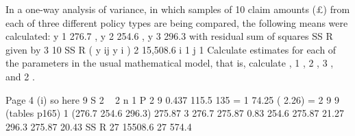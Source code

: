 \documentclass[a4paper,12pt]{article}
\begin{document}
In a one-way analysis of variance, in which samples of 10 claim amounts (£) from
each of three different policy types are being compared, the following means were
calculated:
y 1
276.7 ,
y 2
254.6 ,
y 3
296.3
with residual sum of squares SS R given by
3 10
SS R
( y ij
y i ) 2 15,508.6
i 1 j 1
Calculate estimates for each of the parameters in the usual mathematical model, that
is, calculate , 1 , 2 , 3 , and 2 .


Page 4
(i)
so here 9 S 2 ~
2
n 1
P
2
9
0.437
115.5 135
= 1
74.25
( 2.26) =
2
9
9
(tables p165)
1
(276.7 254.6 296.3) 275.87
3
276.7 275.87 0.83
254.6 275.87
21.27
296.3 275.87 20.43
SS R
27
15508.6
27
574.4
\end{document}
